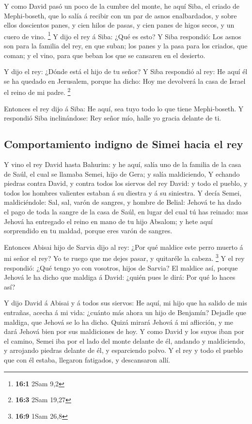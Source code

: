  Y como David pasó un poco de la cumbre del monte, he aquí
Siba, el criado de Mephi-boseth, que lo salía á recibir con un par de
asnos enalbardados, y sobre ellos doscientos panes, y cien hilos de
pasas, y cien panes de higos secos, y un cuero de vino. \footnote{\textbf{16:1}
  2Sam 9,2}  Y dijo el rey á Siba: ¿Qué es esto? Y Siba
respondió: Los asnos son para la familia del rey, en que suban; los
panes y la pasa para los criados, que coman; y el vino, para que beban
los que se cansaren en el desierto.

 Y dijo el rey: ¿Dónde está el hijo de tu señor? Y Siba
respondió al rey: He aquí él se ha quedado en Jerusalem, porque ha
dicho: Hoy me devolverá la casa de Israel el reino de mi padre.
\footnote{\textbf{16:3} 2Sam 19,27}

 Entonces el rey dijo á Siba: He aquí, sea tuyo todo lo
que tiene Mephi-boseth. Y respondió Siba inclinándose: Rey señor mío,
halle yo gracia delante de ti.

\hypertarget{comportamiento-indigno-de-simei-hacia-el-rey}{%
\subsection{Comportamiento indigno de Simei hacia el
rey}\label{comportamiento-indigno-de-simei-hacia-el-rey}}

 Y vino el rey David hasta Bahurim: y he aquí, salía uno
de la familia de la casa de Saúl, el cual se llamaba Semei, hijo de
Gera; y salía maldiciendo,  Y echando piedras contra
David, y contra todos los siervos del rey David: y todo el pueblo, y
todos los hombres valientes estaban á su diestra y á su siniestra.
 Y decía Semei, maldiciéndole: Sal, sal, varón de sangres,
y hombre de Belial:  Jehová te ha dado el pago de toda la
sangre de la casa de Saúl, en lugar del cual tú has reinado: mas Jehová
ha entregado el reino en mano de tu hijo Absalom; y hete aquí
sorprendido en tu maldad, porque eres varón de sangres.

 Entonces Abisai hijo de Sarvia dijo al rey: ¿Por qué
maldice este perro muerto á mi señor el rey? Yo te ruego que me dejes
pasar, y quitaréle la cabeza. \footnote{\textbf{16:9} 1Sam 26,8}
 Y el rey respondió: ¿Qué tengo yo con vosotros, hijos de
Sarvia? El maldice así, porque Jehová le ha dicho que maldiga á David:
¿quién pues le dirá: Por qué lo haces así?

 Y dijo David á Abisai y á todos sus siervos: He aquí, mi
hijo que ha salido de mis entrañas, acecha á mi vida: ¿cuánto más ahora
un hijo de Benjamín? Dejadle que maldiga, que Jehová se lo ha dicho.
 Quizá mirará Jehová á mi aflicción, y me dará Jehová
bien por sus maldiciones de hoy.  Y como David y los
suyos iban por el camino, Semei iba por el lado del monte delante de él,
andando y maldiciendo, y arrojando piedras delante de él, y esparciendo
polvo.  Y el rey y todo el pueblo que con él estaba,
llegaron fatigados, y descansaron allí.

